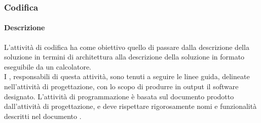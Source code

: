 \documentclass[../NormeDiProgetto_v3.0.0.tex]{subfiles}
\begin{document}
		\subsubsection{Codifica}
			\paragraph{Descrizione}
        	L'attività di codifica ha come obiettivo quello di passare dalla descrizione della soluzione in termini di architettura alla descrizione della soluzione in formato eseguibile da un calcolatore. \\ 
			I \programmatori, responsabili di questa attività, sono tenuti a seguire le linee guida, delineate nell'attività di progettazione, con lo scopo di produrre in output il software designato.
			L'attività di programmazione è basata sul documento prodotto dall'attività di progettazione, e deve rispettare rigorosamente nomi e funzionalità descritti nel documento .
\end{document}
